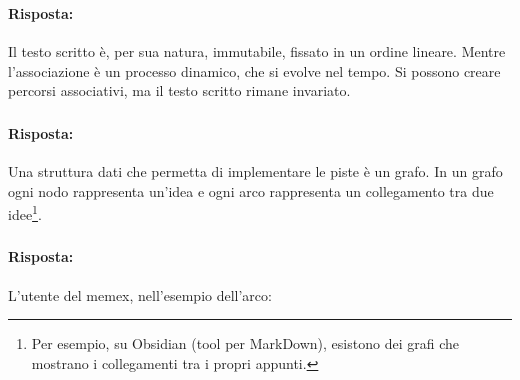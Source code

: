 \subsubsection{}


\paragraph{Risposta:} Il testo scritto è, per sua natura, immutabile, fissato in un ordine lineare. Mentre l'associazione è 
un processo dinamico, che si evolve nel tempo. Si possono creare percorsi associativi, ma il testo scritto rimane invariato.

\subsubsection{}

\pagebreak


\paragraph{Risposta:} Una struttura dati che permetta di implementare le piste è un grafo. In un grafo
ogni nodo rappresenta un'idea e ogni arco rappresenta un collegamento tra due idee\footnote{Per esempio, su Obsidian (tool per MarkDown), esistono dei grafi che mostrano i collegamenti tra i propri appunti.}.

\subsubsection{}


\paragraph{Risposta:} L'utente del memex, nell'esempio dell'arco:

